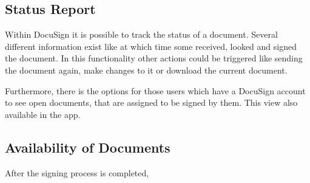 \subsection{Status Report}
Within DocuSign it is possible to track the status of a document. Several different information exist like at which time some received, looked and signed the document. In this functionality other actions could be triggered like sending the document again, make changes to it or download the current document.

Furthermore, there is the options for those users which have a DocuSign account to see open documents, that are assigned to be signed by them. This view also available in the \gls{app}.

\subsection{Availability of Documents}
After the signing process is completed, 